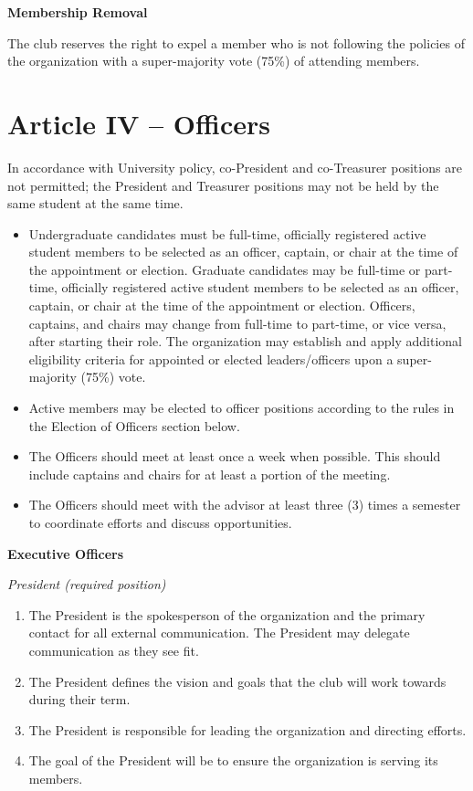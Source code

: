 \documentclass[12pt]{article}
\begin{document}
\textbf{Membership Removal}

The club reserves the right to expel a member who is not following the policies of the organization with a super-majority vote (75\%) of attending members.

\section*{Article IV -- Officers}

In accordance with University policy, co-President and co-Treasurer positions are not permitted; the President and Treasurer positions may not be held by the same student at the same time.

\begin{itemize}
  \item Undergraduate candidates must be full-time, officially registered active student members to be selected as an officer, captain, or chair at the time of the appointment or election. Graduate candidates may be full-time or part-time, officially registered active student members to be selected as an officer, captain, or chair at the time of the appointment or election. Officers, captains, and chairs may change from full-time to part-time, or vice versa, after starting their role. The organization may establish and apply additional eligibility criteria for appointed or elected leaders/officers upon a super-majority (75\%) vote.
  \item Active members may be elected to officer positions according to the rules in the Election of Officers section below.
  \item The Officers should meet at least once a week when possible. This should include captains and chairs for at least a portion of the meeting.
  \item The Officers should meet with the advisor at least three (3) times a semester to coordinate efforts and discuss opportunities.
\end{itemize}

\textbf{Executive Officers}

\textit{President (required position)}
\begin{enumerate}
  \item The President is the spokesperson of the organization and the primary contact for all external communication. The President may delegate communication as they see fit.
  \item The President defines the vision and goals that the club will work towards during their term.
  \item The President is responsible for leading the organization and directing efforts.
  \item The goal of the President will be to ensure the organization is serving its members.
\end{enumerate}
\end{document}

